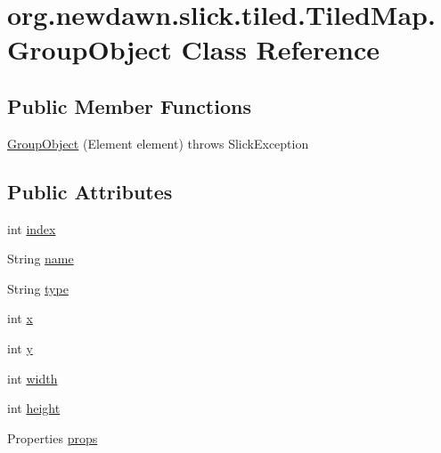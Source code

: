 \hypertarget{classorg_1_1newdawn_1_1slick_1_1tiled_1_1_tiled_map_1_1_group_object}{}\section{org.\+newdawn.\+slick.\+tiled.\+Tiled\+Map.\+Group\+Object Class Reference}
\label{classorg_1_1newdawn_1_1slick_1_1tiled_1_1_tiled_map_1_1_group_object}
\subsection*{Public Member Functions}
\begin{DoxyCompactItemize}
\item 
\mbox{\hyperlink{classorg_1_1newdawn_1_1slick_1_1tiled_1_1_tiled_map_1_1_group_object_a6c56bc60351f83f1aba8a6b25bdefa0b}{Group\+Object}} (Element element)  throws Slick\+Exception 
\end{DoxyCompactItemize}
\subsection*{Public Attributes}
\begin{DoxyCompactItemize}
\item 
int \mbox{\hyperlink{classorg_1_1newdawn_1_1slick_1_1tiled_1_1_tiled_map_1_1_group_object_a29e0a4d647a1aeff45512e34d2664260}{index}}
\item 
String \mbox{\hyperlink{classorg_1_1newdawn_1_1slick_1_1tiled_1_1_tiled_map_1_1_group_object_a647061794f0489797202fc8eab87203e}{name}}
\item 
String \mbox{\hyperlink{classorg_1_1newdawn_1_1slick_1_1tiled_1_1_tiled_map_1_1_group_object_a942a05d677b367df56b5ca6e2e914e81}{type}}
\item 
int \mbox{\hyperlink{classorg_1_1newdawn_1_1slick_1_1tiled_1_1_tiled_map_1_1_group_object_a0d11ce828b2e7773a4cc53ad06c20e4e}{x}}
\item 
int \mbox{\hyperlink{classorg_1_1newdawn_1_1slick_1_1tiled_1_1_tiled_map_1_1_group_object_a071873f26528e4962cfc4fdb552847fa}{y}}
\item 
int \mbox{\hyperlink{classorg_1_1newdawn_1_1slick_1_1tiled_1_1_tiled_map_1_1_group_object_ada43f94fe097ddcd8f21592cd4a1cb6b}{width}}
\item 
int \mbox{\hyperlink{classorg_1_1newdawn_1_1slick_1_1tiled_1_1_tiled_map_1_1_group_object_a4d0f25828c9cff534be4ee5c889d6230}{height}}
\item 
Properties \mbox{\hyperlink{classorg_1_1newdawn_1_1slick_1_1tiled_1_1_tiled_map_1_1_group_object_a63381a58364283a036c59d7f40c1b575}{props}}
\end{DoxyCompactItemize}
